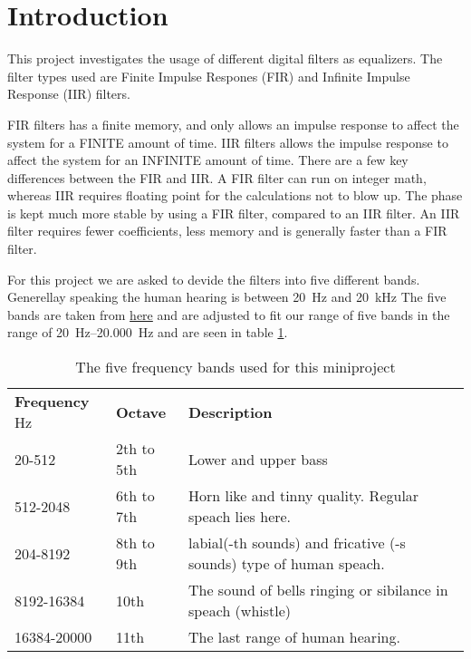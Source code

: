 
\section{Introduction}
This project investigates the usage of different digital filters as equalizers. The filter types used are Finite Impulse Respones (FIR) and Infinite Impulse Response (IIR) filters.

FIR filters has a finite memory, and only allows an impulse response to affect the system for a FINITE amount of time.
IIR filters allows the impulse response to affect the system for an INFINITE amount of time.
There are a few key differences between the FIR and IIR.
A FIR filter can run on integer math, whereas IIR requires floating point for the calculations not to blow up. The phase is kept much more stable by using a FIR filter, compared to an IIR filter.
An IIR filter requires fewer coefficients, less memory and is generally faster than a FIR filter.

For this project we are asked to devide the filters into five different bands. Generellay speaking the human hearing is between \SI{20}{\hertz} and \SI{20}{\kilo\hertz} The five bands are taken from \href{https://en.wikipedia.org/wiki/Audio_frequency}{here} and are adjusted to fit our range of five bands in the range of \SIrange{20}{20.000}{\hertz} and are seen in table \ref{tab:FiveBand}.

\begin{table}[b]
	\caption{The five frequency bands used for this miniproject}
	\label{tab:FiveBand}
	\begin{tabularx}{\textwidth}{X X X}
		\textbf{Frequency} \si{\hertz} & \textbf{Octave} & \textbf{Description} \\
		20-512 & 2th to 5th & Lower and upper bass \\
		512-2048 & 6th to 7th & Horn like and tinny quality. Regular speach lies here. \\
		204-8192 & 8th to 9th & labial(-th sounds) and fricative (-s sounds) type of human speach.\\
		8192-16384 & 10th & The sound of bells ringing or sibilance in speach (whistle)\\
		16384-20000 & 11th & The last range of human hearing. \\
	\end{tabularx}	
\end{table}




